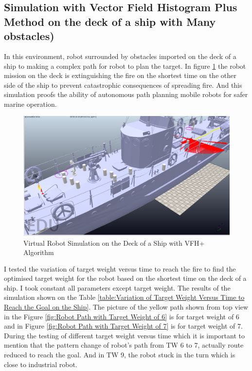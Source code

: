 \subsection{Simulation with Vector Field Histogram Plus Method on the deck of a ship with Many obstacles) }
In this environment, robot surrounded by obstacles imported on the deck of a ship to making a complex path for robot to plan the target. In figure \ref{fig:Virtual Robot Simulation on the Deck of a Ship with VFH+ Algorithm} the robot mission on the deck is extinguishing the fire on the shortest time on the other side of the ship to prevent catastrophic consequences of spreading fire. And this simulation proofs the ability of autonomous path planning mobile robots for safer marine operation. 
\begin{figure}[H]
  \centering
  \includegraphics[width= 1.0\textwidth]{Figures/VFH+SHIP.PNG}
  \caption[Virtual Robot Simulation on the Deck of a Ship with VFH+ Algorithm ]{Virtual Robot Simulation on the Deck of a Ship with VFH+ Algorithm}
   \label{fig:Virtual Robot Simulation on the Deck of a Ship with VFH+ Algorithm} 
\end{figure}
\noindent I tested the variation of target weight versus time to reach the fire to find the optimised target weight for the robot based on the shortest time on the deck of a ship. I took constant all parameters except target weight. The results of the simulation shown on the Table \ref{table:Variation of Target Weight Versus Time to Reach the Goal on the Ship}. The picture of the yellow path shown from top view in the Figure \ref{fig:Robot Path with Target Weight of 6} is for target weight of 6 and in Figure \ref{fig:Robot Path with Target Weight of 7} is for target weight of 7. During the testing of different target weight versus time which it is important to mention that the pattern change of robot's path from TW 6 to 7, actually route reduced to reach the goal. And in TW 9, the robot stuck in the turn which is close to industrial robot. 

